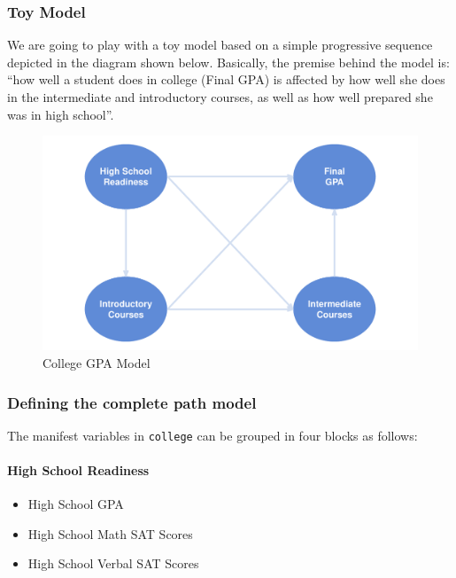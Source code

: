 \documentclass[12pt]{book}\usepackage{graphicx, color}
\newenvironment{knitrout}{}{} %
\newcommand{\code}[1]{\texttt{#1}}
\begin{document}
\subsubsection*{Toy Model}
We are going to play with a toy model based on a simple progressive sequence depicted in the diagram shown below. Basically, the premise behind the model is: ``how well a student does in college (Final GPA) is affected by how well she does in the intermediate and introductory courses, as well as how well prepared she was in high school''.
\begin{knitrout}
\color{fgcolor}\begin{figure}[h]


{\centering \includegraphics[width=.85\linewidth,height=.45\linewidth]{figure/gpa_dummy_model} 

}

\caption[College GPA Model]{College GPA Model\label{fig:gpa_dummy_model}}
\end{figure}


\end{knitrout}



\subsubsection*{Defining the complete path model}
The manifest variables in \code{college} can be grouped in four blocks as follows: 

\paragraph{High School Readiness}
\begin{itemize}
 \item[] High School GPA
 \item[] High School Math SAT Scores
 \item[] High School Verbal SAT Scores
\end{itemize}
\end{document}
